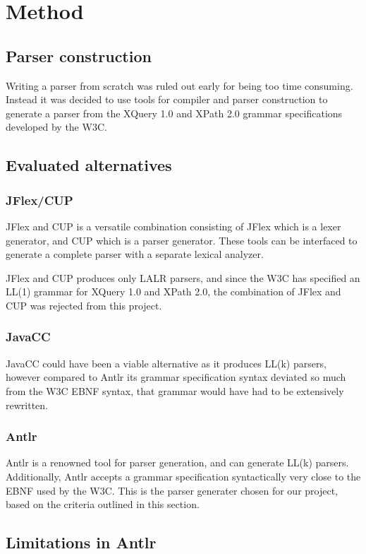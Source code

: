\chapter{Method}
\section{Parser construction}
Writing a parser from scratch was ruled out early for being too time consuming.
Instead it was decided to use tools for compiler and parser construction to
generate a parser from the XQuery 1.0 and XPath 2.0 grammar specifications
developed by the W3C.

\section{Evaluated alternatives}
\subsection{JFlex/CUP}
JFlex and CUP is a versatile combination consisting of JFlex which is a lexer
generator, and CUP which is a parser generator. These tools can be interfaced to
generate a complete parser with a separate lexical analyzer.

JFlex and CUP produces only LALR parsers, and since the W3C has specified an
LL(1) grammar for XQuery 1.0 and XPath 2.0, the combination of JFlex and CUP was
rejected from this project.

\subsection{JavaCC}
JavaCC could have been a viable alternative as it produces LL(k) parsers,
however compared to Antlr its grammar specification syntax deviated so much
from the W3C EBNF syntax, that grammar would have had to be extensively
rewritten.

\subsection{Antlr}
Antlr is a renowned tool for parser generation, and can generate LL(k) parsers.
Additionally, Antlr accepts a grammar specification syntactically very close to
the EBNF used by the W3C. This is the parser generater chosen for our project,
based on the criteria outlined in this section.

\section{Limitations in Antlr}
